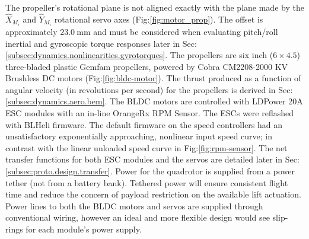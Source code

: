 The propeller's rotational plane is not aligned exactly with the plane made by the $\hat{X}_{M_i}$ and $\hat{Y}_{M_i}$ rotational servo axes (Fig:\ref{fig:motor_prop}). The offset is approximately $23.0~\text{mm}$ and must be considered when evaluating pitch/roll inertial and gyroscopic torque responses later in Sec:\ref{subsec:dynamics.nonlinearities.gyrotorques}. The propellers are six inch ($6 \times 4.5$) three-bladed plastic Gemfam propellers, powered by Cobra CM2208-2000 KV Brushless DC motors (Fig:\ref{fig:bldc-motor}). The thrust produced as a function of angular velocity (in revolutions per second) for the propellers is derived in Sec:\ref{subsec:dynamics.aero.bem}. 
\newpage
The BLDC motors are controlled with LDPower 20A ESC modules with an in-line OrangeRx RPM Sensor. The ESCs were reflashed with BLHeli\cite{BLHeli} firmware. The default firmware on the speed controllers had an unsatisfactory exponentially approaching, nonlinear input speed curve; in contrast with the linear unloaded speed curve in Fig:\ref{fig:rpm-sensor}. The net transfer functions for both ESC modules and the servos are detailed later in Sec:\ref{subsec:proto.design.transfer}. Power for the quadrotor is supplied from a power tether (not from a battery bank). Tethered power will ensure consistent flight time and reduce the concern of payload restriction on the available lift actuation. Power lines to both the BLDC motors and servos are supplied through conventional wiring, however an ideal and more flexible design would see slip-rings for each module's power supply. 
